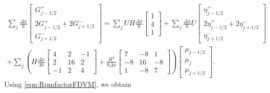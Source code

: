 \begin{multline*}
\sum_j \frac{\Delta x}{6}\begin{bmatrix} G^+_{j -1/2} \\2 G^+_{j -1/2}+2 G^-_{j +1/2} \\ G^-_{j +1/2} \end{bmatrix} = \sum_jUH \frac{\Delta x}{6}\begin{bmatrix} 1 \\4 \\ 1 \end{bmatrix} +  \sum_j \frac{\Delta x}{6}U\begin{bmatrix} \eta^+_{j -1/2} \\2 \eta^+_{j -1/2}+2 \eta^-_{j +1/2} \\ \eta^-_{j +1/2} \end{bmatrix}\\ + \sum_j \left(H\frac{\Delta x}{30}\begin{bmatrix} 4 &2 &-1 \\2 &16 &2  \\-1 &2 &4 \end{bmatrix} + \frac{H^3 }{9\Delta x}\begin{bmatrix} 7 &-8 &1  \\-8 &16 &-8  \\1 &-8 &7  \end{bmatrix} \right) \begin{bmatrix} \mu_{j -1/2} \\\mu_{j} \\ \mu_{j +1/2} \end{bmatrix}.
\end{multline*} 
Using \eqref{eqn:RpmfactorFDVM}, we obtain

